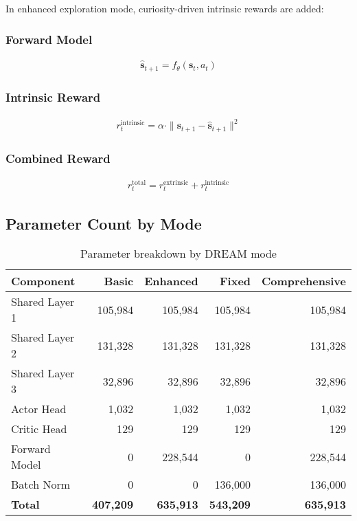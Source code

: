 \documentclass[12pt]{article}
\begin{document}
In enhanced exploration mode, curiosity-driven intrinsic rewards are added:

\subsubsection{Forward Model}
\begin{align}
\hat{\mathbf{s}}_{t+1} = f_{\theta}(\mathbf{s}_t, a_t)
\end{align}

\subsubsection{Intrinsic Reward}
\begin{align}
r_t^{\text{intrinsic}} = \alpha \cdot \|\mathbf{s}_{t+1} - \hat{\mathbf{s}}_{t+1}\|^2
\end{align}

\subsubsection{Combined Reward}
\begin{align}
r_t^{\text{total}} = r_t^{\text{extrinsic}} + r_t^{\text{intrinsic}}
\end{align}

\subsection{Parameter Count by Mode}

\begin{table}[h]
\centering
\begin{tabular}{@{}lrrrr@{}}
\toprule
Component & Basic & Enhanced & Fixed & Comprehensive \\
\midrule
Shared Layer 1 & 105,984 & 105,984 & 105,984 & 105,984 \\
Shared Layer 2 & 131,328 & 131,328 & 131,328 & 131,328 \\
Shared Layer 3 & 32,896 & 32,896 & 32,896 & 32,896 \\
Actor Head & 1,032 & 1,032 & 1,032 & 1,032 \\
Critic Head & 129 & 129 & 129 & 129 \\
Forward Model & 0 & 228,544 & 0 & 228,544 \\
Batch Norm & 0 & 0 & 136,000 & 136,000 \\
\midrule
\textbf{Total} & \textbf{407,209} & \textbf{635,913} & \textbf{543,209} & \textbf{635,913} \\
\bottomrule
\end{tabular}
\caption{Parameter breakdown by DREAM mode}
\end{table}
\end{document}
